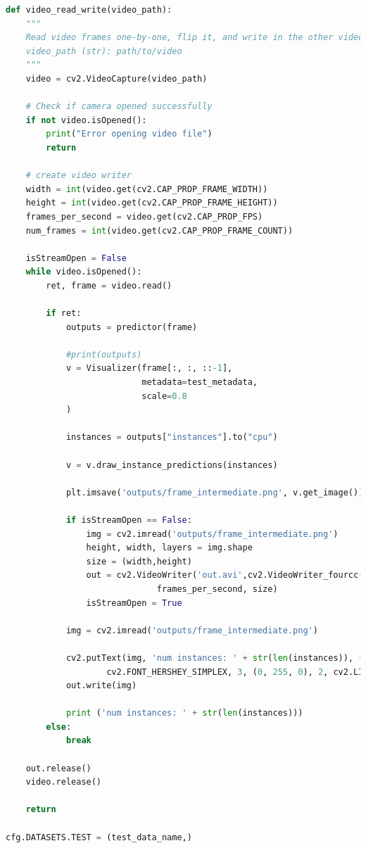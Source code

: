 \begin{lstlisting}[language=Python, caption=Inferens RetinaNet i inference.py]
def video_read_write(video_path):
    """
    Read video frames one-by-one, flip it, and write in the other video.
    video_path (str): path/to/video
    """
    video = cv2.VideoCapture(video_path)
    
    # Check if camera opened successfully
    if not video.isOpened(): 
        print("Error opening video file")
        return
    
    # create video writer
    width = int(video.get(cv2.CAP_PROP_FRAME_WIDTH))
    height = int(video.get(cv2.CAP_PROP_FRAME_HEIGHT))
    frames_per_second = video.get(cv2.CAP_PROP_FPS)
    num_frames = int(video.get(cv2.CAP_PROP_FRAME_COUNT))
    
    isStreamOpen = False
    while video.isOpened():
        ret, frame = video.read()
        
        if ret:
            outputs = predictor(frame)

            #print(outputs)
            v = Visualizer(frame[:, :, ::-1],
                           metadata=test_metadata, 
                           scale=0.8
            )

            instances = outputs["instances"].to("cpu")

            v = v.draw_instance_predictions(instances)

            plt.imsave('outputs/frame_intermediate.png', v.get_image())

            if isStreamOpen == False:
                img = cv2.imread('outputs/frame_intermediate.png')
                height, width, layers = img.shape
                size = (width,height)
                out = cv2.VideoWriter('out.avi',cv2.VideoWriter_fourcc(*'DIVX'),
                		      frames_per_second, size)
                isStreamOpen = True

            img = cv2.imread('outputs/frame_intermediate.png')

            cv2.putText(img, 'num instances: ' + str(len(instances)), (5,100),
            		cv2.FONT_HERSHEY_SIMPLEX, 3, (0, 255, 0), 2, cv2.LINE_AA)
            out.write(img)

            print ('num instances: ' + str(len(instances)))
        else:
            break
    
    out.release()
    video.release()
    
    return

cfg.DATASETS.TEST = (test_data_name,)


\end{lstlisting}
